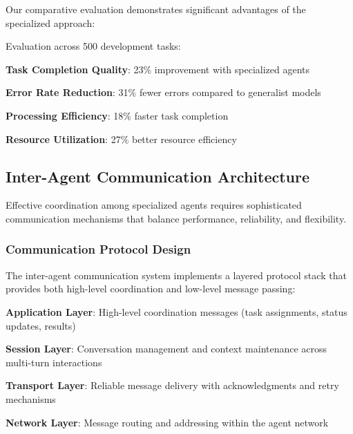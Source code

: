 Our comparative evaluation demonstrates significant advantages of the specialized approach:

\begin{infobox}[title=Specialization vs. Generalization Performance]
Evaluation across 500 development tasks:
\begin{compactlist}
    \item \textbf{Task Completion Quality}: 23\% improvement with specialized agents
    \item \textbf{Error Rate Reduction}: 31\% fewer errors compared to generalist models
    \item \textbf{Processing Efficiency}: 18\% faster task completion
    \item \textbf{Resource Utilization}: 27\% better resource efficiency
\end{compactlist}
\end{infobox}

\subsection*{Inter-Agent Communication Architecture}

Effective coordination among specialized agents requires sophisticated communication mechanisms that balance performance, reliability, and flexibility.

\subsubsection*{Communication Protocol Design}

The inter-agent communication system implements a layered protocol stack that provides both high-level coordination and low-level message passing:

\begin{expandedlist}
    \item \textbf{Application Layer}: High-level coordination messages (task assignments, status updates, results)
    \item \textbf{Session Layer}: Conversation management and context maintenance across multi-turn interactions
    \item \textbf{Transport Layer}: Reliable message delivery with acknowledgments and retry mechanisms
    \item \textbf{Network Layer}: Message routing and addressing within the agent network
\end{expandedlist}

